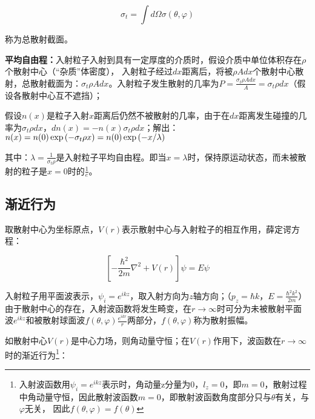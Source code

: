 \begin{equation}\label{26-2}
\sigma _t  = \int {d\Omega \sigma \left( {\theta ,\varphi } \right)}
\end{equation}

称为总散射截面。

\textbf{平均自由程：}入射粒子入射到具有一定厚度的介质时，假设介质中单位体积存在$\rho$个散射中心（``杂质''体密度），
入射粒子经过$dx$距离后，将被$\rho Adx$个散射中心散射，总散射截面为：$\sigma _t \rho Adx$。入射粒子发生散射的几率为$P = \frac{{\sigma _t \rho Adx}}{A} = \sigma _t \rho dx$（假设各散射中心互不遮挡）；

假设$n(x)$是粒子入射$x$距离后仍然不被散射的几率，由于在$dx$距离发生碰撞的几率为$\sigma _t \rho dx$，$dn(x) =  - n(x)\sigma _t \rho dx$；解出：$n(x) = n(0)\exp \left( { - \sigma _t \rho x} \right) = n(0)\exp \left( { - {x \mathord{\left/
 {\vphantom {x \lambda }} \right.
 \kern-\nulldelimiterspace} \lambda }} \right)$


其中：$\lambda  = \frac{1}{{\sigma _t \rho }}$是入射粒子平均自由程。即当$x = \lambda $时，保持原运动状态，而未被散射的粒子是$x=0$时的$\frac{1}{e}$。


\subsection{渐近行为}

取散射中心为坐标原点，$V(r)$表示散射中心与入射粒子的相互作用，薛定谔方程：



\begin{equation}\label{26-3}
\left[ { - \frac{{\hbar ^2 }}{{2m}}\nabla ^2  + V(r)} \right]\psi  = E\psi
\end{equation}

入射粒子用平面波表示，$\psi _i  = e^{ikz} $，取入射方向为$z$轴方向；（$p_z  = \hbar k$，$E = \frac{{\hbar ^2 k^2 }}{{2m}}$）
由于散射中心的存在，入射波函数将发生畸变，在$r \to \infty $时可分为未被散射平面波$e^{ikz} $和被散射球面波$f\left( {\theta ,\varphi } \right)\frac{{e^{ikr} }}{r}$两部分，$f\left( {\theta ,\varphi } \right)$称为散射振幅。


如散射中心$V(r)$是中心力场，则角动量守恒；在$V(r)$作用下，波函数在$r \to \infty $时的渐近行为\footnote{入射波函数用$\psi _i  = e^{ikz} $表示时，角动量z分量为0，$l_z  = 0$，即$m = 0$，散射过程中角动量守恒，因此散射波函数$m = 0$，即散射波函数角度部分只与$\theta$有关，与$\varphi$无关，
因此$f\left( {\theta ,\varphi } \right) = f\left( \theta  \right)$}：

